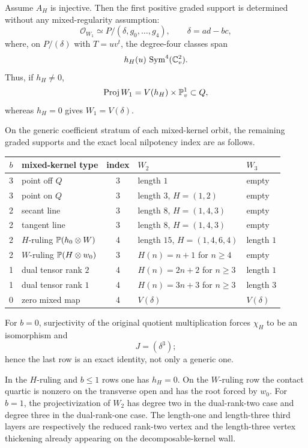 \begin{theorem}
\label{thm:corank-two-mixed-kernel-atlas}
Assume \(A_H\) is injective.  Then the first positive graded support
is determined without any mixed-regularity assumption:
\begin{equation}\label{eq:W1-all-Ainj}
 \mathcal O_{W_1}
 \simeq
 P/(\delta,g_0,\ldots,g_4),
 \qquad \delta=ad-bc,
\end{equation}
where, on \(P/(\delta)\) with \(T=uv^t\), the degree-four classes
span
\[
 h_H(u)\,\operatorname{Sym}^4(\mathbb C^2_v).
\]
Thus, if \(h_H\ne0\),
\[
 \operatorname{Proj} W_1=V(h_H)\times\mathbb P^1_v\subset Q,
\]
whereas \(h_H=0\) gives \(W_1=V(\delta)\).

On the generic coefficient stratum of each mixed-kernel orbit, the
remaining graded supports and the exact local nilpotency index are as
follows.
\begin{center}
\small
\begin{tabular}{@{}c l c l l@{}}
\toprule
\(b\)&mixed-kernel type&index&\(W_2\)&\(W_3\)\\
\midrule
3&point off \(Q\)&3&length \(1\)&empty\\
3&point on \(Q\)&3&length \(3\), \(H=(1,2)\)&empty\\
2&secant line&3&length \(8\), \(H=(1,4,3)\)&empty\\
2&tangent line&3&length \(8\), \(H=(1,4,3)\)&empty\\
2&\(H\)-ruling \(\mathbb P(h_0\otimes W)\)&4&length \(15\), \(H=(1,4,6,4)\)&length \(1\)\\
2&\(W\)-ruling \(\mathbb P(H\otimes w_0)\)&3&
 \(H(n)=n+1\) for \(n\ge4\)&empty\\
1&dual tensor rank \(2\)&4&
 \(H(n)=2n+2\) for \(n\ge3\)&length \(1\)\\
1&dual tensor rank \(1\)&4&
 \(H(n)=3n+3\) for \(n\ge3\)&length \(3\)\\
0&zero mixed map&4&\(V(\delta)\)&\(V(\delta)\)\\
\bottomrule
\end{tabular}
\end{center}
For \(b=0\), surjectivity of the original quotient multiplication
forces \(\chi_H\) to be an isomorphism and
\begin{equation}\label{eq:b0-delta3}
 J=(\delta^3);
\end{equation}
hence the last row is an exact identity, not only a generic one.

In the \(H\)-ruling and \(b\le1\) rows one has \(h_H=0\).  On the
\(W\)-ruling row the contact quartic is nonzero on the transverse open
and has the root forced by \(w_0\).
For \(b=1\), the projectivization of \(W_2\) has degree two in the
dual-rank-two case and degree three in the dual-rank-one case.  The
length-one and length-three third layers are respectively the reduced
rank-two vertex and the length-three vertex thickening already
appearing on the decomposable-kernel wall.
\end{theorem}

